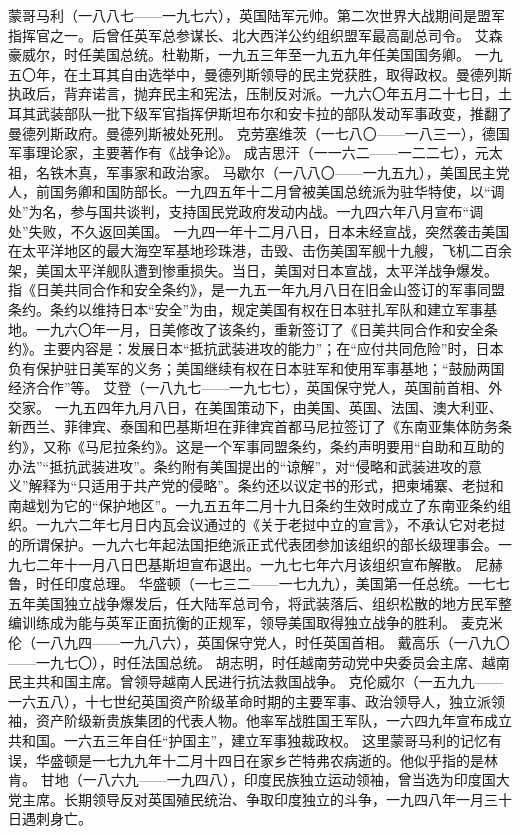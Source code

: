 \begin{maonote}
蒙哥马利（一八八七——一九七六），英国陆军元帅。第二次世界大战期间是盟军指挥官之一。后曾任英军总参谋长、北大西洋公约组织盟军最高副总司令。
艾森豪威尔，时任美国总统。杜勒斯，一九五三年至一九五九年任美国国务卿。
一九五〇年，在土耳其自由选举中，曼德列斯领导的民主党获胜，取得政权。曼德列斯执政后，背弃诺言，抛弃民主和宪法，压制反对派。一九六〇年五月二十七日，土耳其武装部队一批下级军官指挥伊斯坦布尔和安卡拉的部队发动军事政变，推翻了曼德列斯政府。曼德列斯被处死刑。
克劳塞维茨（一七八〇——一八三一），德国军事理论家，主要著作有《战争论》。
成吉思汗（一一六二——一二二七），元太祖，名铁木真，军事家和政治家。
马歇尔（一八八〇——一九五九），美国民主党人，前国务卿和国防部长。一九四五年十二月曾被美国总统派为驻华特使，以“调处”为名，参与国共谈判，支持国民党政府发动内战。一九四六年八月宣布“调处”失败，不久返回美国。
一九四一年十二月八日，日本未经宣战，突然袭击美国在太平洋地区的最大海空军基地珍珠港，击毁、击伤美国军舰十九艘，飞机二百余架，美国太平洋舰队遭到惨重损失。当日，美国对日本宣战，太平洋战争爆发。
指《日美共同合作和安全条约》，是一九五一年九月八日在旧金山签订的军事同盟条约。条约以维持日本“安全”为由，规定美国有权在日本驻扎军队和建立军事基地。一九六〇年一月，日美修改了该条约，重新签订了《日美共同合作和安全条约》。主要内容是：发展日本“抵抗武装进攻的能力”；在“应付共同危险”时，日本负有保护驻日美军的义务；美国继续有权在日本驻军和使用军事基地；“鼓励两国经济合作”等。
艾登（一八九七——一九七七），英国保守党人，英国前首相、外交家。
一九五四年九月八日，在美国策动下，由美国、英国、法国、澳大利亚、新西兰、菲律宾、泰国和巴基斯坦在菲律宾首都马尼拉签订了《东南亚集体防务条约》，又称《马尼拉条约》。这是一个军事同盟条约，条约声明要用“自助和互助的办法”“抵抗武装进攻”。条约附有美国提出的“谅解”，对“侵略和武装进攻的意义”解释为“只适用于共产党的侵略”。条约还以议定书的形式，把柬埔寨、老挝和南越划为它的“保护地区”。一九五五年二月十九日条约生效时成立了东南亚条约组织。一九六二年七月日内瓦会议通过的《关于老挝中立的宣言》，不承认它对老挝的所谓保护。一九六七年起法国拒绝派正式代表团参加该组织的部长级理事会。一九七二年十一月八日巴基斯坦宣布退出。一九七七年六月该组织宣布解散。
尼赫鲁，时任印度总理。
华盛顿（一七三二——一七九九），美国第一任总统。一七七五年美国独立战争爆发后，任大陆军总司令，将武装落后、组织松散的地方民军整编训练成为能与英军正面抗衡的正规军，领导美国取得独立战争的胜利。
麦克米伦（一八九四——一九八六），英国保守党人，时任英国首相。
戴高乐（一八九〇——一九七〇），时任法国总统。
胡志明，时任越南劳动党中央委员会主席、越南民主共和国主席。曾领导越南人民进行抗法救国战争。
克伦威尔（一五九九——一六五八），十七世纪英国资产阶级革命时期的主要军事、政治领导人，独立派领袖，资产阶级新贵族集团的代表人物。他率军战胜国王军队，一六四九年宣布成立共和国。一六五三年自任“护国主”，建立军事独裁政权。
这里蒙哥马利的记忆有误，华盛顿是一七九九年十二月十四日在家乡芒特弗农病逝的。他似乎指的是林肯。
甘地（一八六九——一九四八），印度民族独立运动领袖，曾当选为印度国大党主席。长期领导反对英国殖民统治、争取印度独立的斗争，一九四八年一月三十日遇刺身亡。
\end{maonote}
